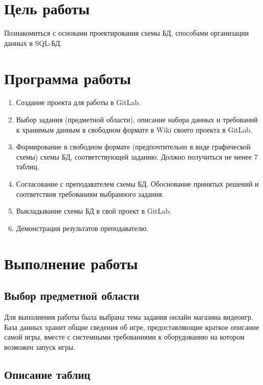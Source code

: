 





\tableofcontents
\newpage

\section{Цель работы}

Познакомиться с основами проектирования схемы БД, способами организации данных в SQL-БД.

\section{Программа работы}

\begin{enumerate}
	\item Создание проекта для работы в GitLab.
	\item Выбор задания (предметной области), описание набора данных и требований к хранимым данным в свободном формате в Wiki своего проекта в GitLab.
	\item Формирование в свободном формате (предпочтительно в виде графической схемы) схемы БД, соответствующей заданию. Должно получиться не менее 7 таблиц.
	\item Согласование с преподавателем схемы БД. Обоснование принятых решений и соответствия требованиям выбранного задания. 
	\item Выкладывание схемы БД в свой проект в GitLab.
	\item Демонстрация результатов преподавателю.
\end{enumerate}

\section{Выполнение работы}


\subsection{Выбор предметной области}

Для выполнения работы была выбрана тема задания онлайн магазина видеоигр. База данных хранит общие сведения об игре, предоставляющие краткое описание самой игры, вместе с системными требованиями к оборудованию на котором возможен запуск игры.

\subsection{Описание таблиц}

